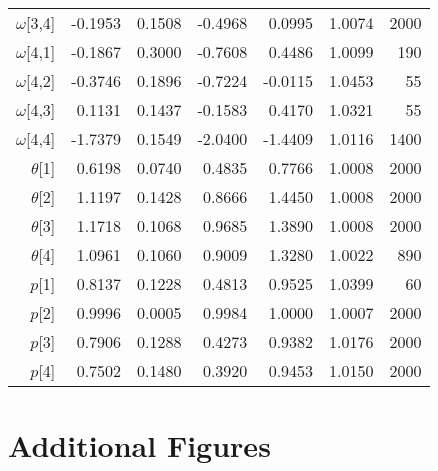 \documentclass[11pt]{article}
\begin{document}
\begin{table}[ht]
\begin{tabular}{rrrrrrr}
  $\omega$[3,4] & -0.1953 & 0.1508 & -0.4968 & 0.0995 & 1.0074 &  2000 \\ 
  $\omega$[4,1] & -0.1867 & 0.3000 & -0.7608 & 0.4486 & 1.0099 &   190 \\ 
  $\omega$[4,2] & -0.3746 & 0.1896 & -0.7224 & -0.0115 & 1.0453 &    55 \\ 
  $\omega$[4,3] & 0.1131 & 0.1437 & -0.1583 & 0.4170 & 1.0321 &    55 \\ 
  $\omega$[4,4] & -1.7379 & 0.1549 & -2.0400 & -1.4409 & 1.0116 &  1400 \\ 
   $\theta$[1] & 0.6198 & 0.0740 & 0.4835 & 0.7766 & 1.0008 &  2000 \\ 
   $\theta$[2] & 1.1197 & 0.1428 & 0.8666 & 1.4450 & 1.0008 &  2000 \\ 
   $\theta$[3] & 1.1718 & 0.1068 & 0.9685 & 1.3890 & 1.0008 &  2000 \\ 
  $\theta$[4] & 1.0961 & 0.1060 & 0.9009 & 1.3280 & 1.0022 &   890 \\ 
  $p$[1] & 0.8137 & 0.1228 & 0.4813 & 0.9525 & 1.0399 &    60 \\ 
  $p$[2] & 0.9996 & 0.0005 & 0.9984 & 1.0000 & 1.0007 &  2000 \\ 
  $p$[3] & 0.7906 & 0.1288 & 0.4273 & 0.9382 & 1.0176 &  2000 \\ 
  $p$[4] & 0.7502 & 0.1480 & 0.3920 & 0.9453 & 1.0150 &  2000 \\ 
   \hline
\end{tabular}
\end{table}


\clearpage

\section{Additional Figures} 
\end{document}
